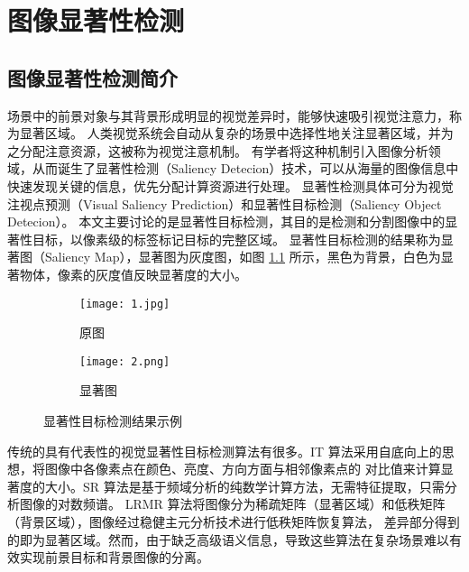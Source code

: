 
\chapter{图像显著性检测}

\section{图像显著性检测简介}

场景中的前景对象与其背景形成明显的视觉差异时，能够快速吸引视觉注意力，称为显著区域。
人类视觉系统会自动从复杂的场景中选择性地关注显著区域，并为之分配注意资源，这被称为视觉注意机制。
有学者将这种机制引入图像分析领域，从而诞生了显著性检测（Saliency Detecion）技术，可以从海量的图像信息中快速发现关键的信息，优先分配计算资源进行处理。
显著性检测具体可分为视觉注视点预测（Visual Saliency Prediction）和显著性目标检测（Saliency Object Detecion）。
本文主要讨论的是显著性目标检测，其目的是检测和分割图像中的显著性目标，以像素级的标签标记目标的完整区域。
显著性目标检测的结果称为显著图（Saliency Map），显著图为灰度图，如图 \ref{fig:example} 所示，黑色为背景，白色为显著物体，像素的灰度值反映显著度的大小。

\begin{figure}[h]
    \centering
    \begin{subfigure}{.4\textwidth}
        \centering
        \texttt{[image: 1.jpg]}
        \caption{原图}
    \end{subfigure}
    \begin{subfigure}{.4\textwidth}
        \centering
        \texttt{[image: 2.png]}
        \caption{显著图}
    \end{subfigure}
    \caption{显著性目标检测结果示例}
    \label{fig:example}
\end{figure}

传统的具有代表性的视觉显著性目标检测算法有很多。IT\cite{IT} 算法采用自底向上的思想，将图像中各像素点在颜色、亮度、方向方面与相邻像素点的
对比值来计算显著度的大小。SR\cite{SR} 算法是基于频域分析的纯数学计算方法，无需特征提取，只需分析图像的对数频谱。
LRMR\cite{LRMR} 算法将图像分为稀疏矩阵（显著区域）和低秩矩阵（背景区域），图像经过稳健主元分析技术进行低秩矩阵恢复算法，
差异部分得到的即为显著区域。然而，由于缺乏高级语义信息，导致这些算法在复杂场景难以有效实现前景目标和背景图像的分离。

